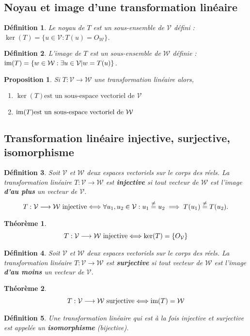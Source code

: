 \documentclass{article}[french, babel]
\newtheorem{mydef}{Définition}
\newtheorem{myprop}{Proposition}
\newtheorem{mythm}{Théorème}
\begin{document}
	\subsection{Noyau et image d'une transformation linéaire}
		\begin{mydef}
			Le noyau de $T$ est un sous-ensemble de $\mathcal{V}$ défini : $\ker (T)=\{u\in\mathcal{V} : T(u)=O_{\mathcal{W}}\}$.
		\end{mydef}
		\begin{mydef}
			L'image de $T$ est un sous-ensemble de $\mathcal{W}$ définie : $\text{\normalfont{im}}(T) = \{w\in\mathcal{W} : \exists u\in\mathcal{V} | w=T(u)\}$.
		\end{mydef}	
		\begin{myprop}
			Si $T:\mathcal{V}\longrightarrow\mathcal{W}$ une transformation linéaire alors,
			\begin{enumerate}
				\item $\ker(T) \text{est un sous-espace vectoriel de }\mathcal{V}$
				\item $\text{\normalfont{im}}(T) \text{est un sous-espace vectoriel de }\mathcal{W}$
			\end{enumerate}
		\end{myprop}
	\subsection{Transformation linéaire injective, surjective, isomorphisme}
		\begin{mydef}
				Soit $\mathcal{V}$ et $\mathcal{W}$ deux espaces vectoriels sur le corps des réels. La transformation linéaire $T:\mathcal{V}\longrightarrow\mathcal{W}$ est \textbf{injective} si tout vecteur de $\mathcal{W}$ est l'image \textbf{d'au plus} un vecteur de $\mathcal{V}$. \[T:\mathcal{V}\longrightarrow\mathcal{W}\text{\normalfont{ injective}}\Longleftrightarrow \forall u_1,u_2\in\mathcal{V} : u_1\stackrel{\neq}{=} u_2\implies T(u_1)\stackrel{\neq}{=} T(u_2).\]
		\end{mydef}
		\begin{mythm}
			\[T:\mathcal{V}\longrightarrow\mathcal{W}\text{\normalfont{ injective}}\Longleftrightarrow \ker(T) =\{O_{\mathcal{V}}\}\]
		\end{mythm}
		\begin{mydef}
			Soit $\mathcal{V}$ et $\mathcal{W}$ deux espaces vectoriels sur le corps des réels. La transformation linéaire $T:\mathcal{V}\longrightarrow\mathcal{W}$ est \textbf{surjective} si tout vecteur de $\mathcal{W}$ est l'image \textbf{d'au moins} un vecteur de $\mathcal{V}$.
		\end{mydef}
		\begin{mythm}
			\[T:\mathcal{V}\longrightarrow\mathcal{W}\text{\normalfont{ surjective}}\Longleftrightarrow\text{\normalfont{im}}(T)=\mathcal{W}\]
		\end{mythm}
		\begin{mydef}
			Une transformation linéaire qui est à la fois injective et surjective est appelée un \textbf{isomorphisme} (bijective).
		\end{mydef}
\end{document}
